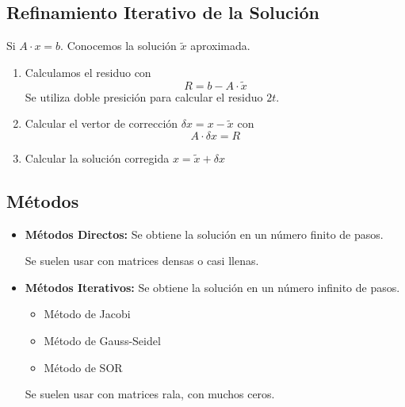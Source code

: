 \documentclass[../main.tex]{subfiles}
\begin{document}
    \subsection{Refinamiento Iterativo de la Solución}
        Si $A \cdot x = b$. Conocemos la solución $\widetilde{x}$ aproximada.\\
        \begin{enumerate}
            \item Calculamos el residuo con 
                \begin{equation}
                    R = b - A \cdot \widetilde{x}
                \end{equation}
                Se utiliza doble presición para calcular el residuo $2t$.
            
            \item Calcular el vertor de corrección $\delta x = x - \widetilde{x}$ con
                \begin{equation}
                    A \cdot \delta x = R
                \end{equation}
               
            \item Calcular la solución corregida $x = \widetilde{x} + \delta x$
            \end{enumerate}
    
    \subsection{Métodos}
        \begin{itemize}
            \item \textbf{Métodos Directos:} Se obtiene la solución en un número finito de pasos.
            
                Se suelen usar con matrices densas o casi llenas.
            \item \textbf{Métodos Iterativos:} Se obtiene la solución en un número infinito de pasos.
                \begin{itemize}
                    \item Método de Jacobi
                    \item Método de Gauss-Seidel
                    \item Método de SOR
                \end{itemize}

                Se suelen usar con matrices rala, con muchos ceros.
        \end{itemize}
\end{document}
